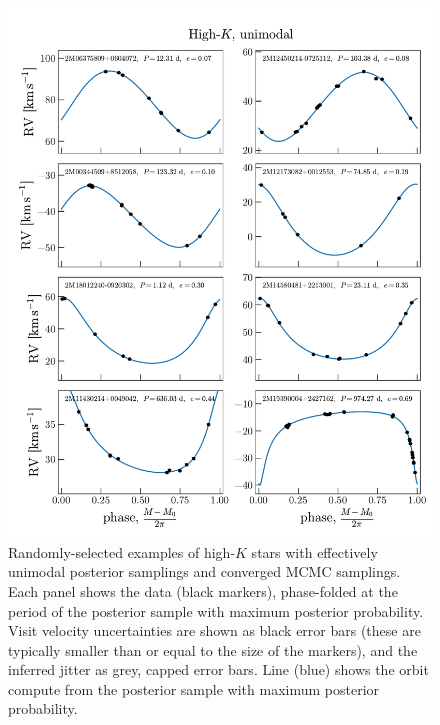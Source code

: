 \documentclass[modern, letterpaper]{aastex62}
\begin{document}
\begin{figure}[hp]
\begin{center}
\includegraphics[width=\textwidth]{highK-unimodal}
\end{center}
\caption{%
Randomly-selected examples of high-$K$ stars with effectively unimodal posterior
samplings and converged MCMC samplings.
Each panel shows the data (black markers), phase-folded at the period of the
posterior sample with maximum posterior probability.
Visit velocity uncertainties are shown as black error bars (these are typically
smaller than or equal to the size of the markers), and the inferred jitter as
grey, capped error bars.
Line (blue) shows the orbit compute from the posterior sample with maximum
posterior probability.
\label{fig:highK-unimodal}
}
\end{figure}
\end{document}

